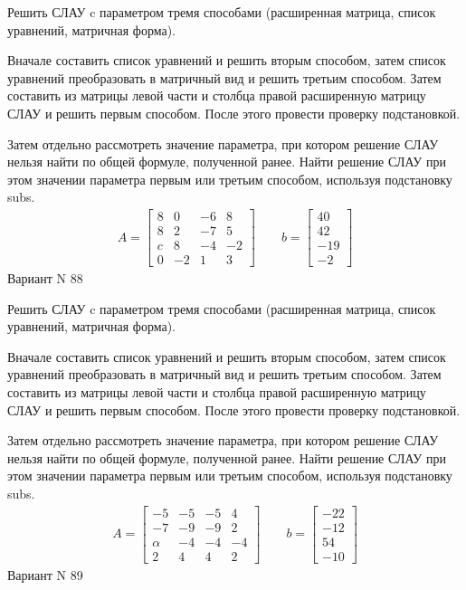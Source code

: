 \documentclass[11pt]{report}
\begin{document}
Решить СЛАУ c параметром тремя способами (расширенная матрица, список уравнений, матричная форма).

Вначале составить список уравнений и решить вторым способом,
затем список уравнений преобразовать в матричный вид и решить третьим способом.
Затем составить из матрицы левой части и столбца правой расширенную матрицу СЛАУ и решить первым способом.
После этого провести проверку подстановкой.

Затем отдельно рассмотреть значение параметра, при котором решение СЛАУ нельзя найти по общей формуле,
полученной ранее.
Найти решение СЛАУ при этом значении параметра первым или третьим способом, используя подстановку subs.
\begin{align*}
    A = \left[\begin{matrix}8 & 0 & -6 & 8\\8 & 2 & -7 & 5\\c & 8 & -4 & -2\\0 & -2 & 1 & 3\end{matrix}\right]
\qquad b = \left[\begin{matrix}40\\42\\-19\\-2\end{matrix}\right]
\end{align*}
\newpage
Вариант N 88


Решить СЛАУ c параметром тремя способами (расширенная матрица, список уравнений, матричная форма).

Вначале составить список уравнений и решить вторым способом,
затем список уравнений преобразовать в матричный вид и решить третьим способом.
Затем составить из матрицы левой части и столбца правой расширенную матрицу СЛАУ и решить первым способом.
После этого провести проверку подстановкой.

Затем отдельно рассмотреть значение параметра, при котором решение СЛАУ нельзя найти по общей формуле,
полученной ранее.
Найти решение СЛАУ при этом значении параметра первым или третьим способом, используя подстановку subs.
\begin{align*}
    A = \left[\begin{matrix}-5 & -5 & -5 & 4\\-7 & -9 & -9 & 2\\\alpha & -4 & -4 & -4\\2 & 4 & 4 & 2\end{matrix}\right]
\qquad b = \left[\begin{matrix}-22\\-12\\54\\-10\end{matrix}\right]
\end{align*}
\newpage
Вариант N 89
\end{document}
